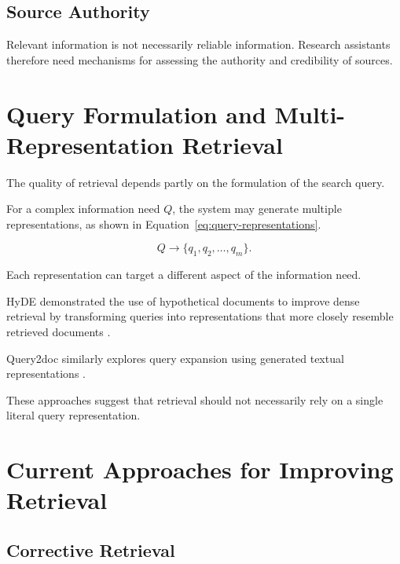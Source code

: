 \documentclass[12pt,a4paper]{article}
\begin{document}
\subsection{Source Authority}

Relevant information is not necessarily reliable information. Research
assistants therefore need mechanisms for assessing the authority and
credibility of sources.

\section{Query Formulation and Multi-Representation Retrieval}
\label{sec:query-formulation}

The quality of retrieval depends partly on the formulation of the search
query.

For a complex information need $Q$, the system may generate multiple
representations, as shown in Equation~\ref{eq:query-representations}.

\begin{equation}
Q \rightarrow \{q_1,q_2,\ldots,q_m\}.
\label{eq:query-representations}
\end{equation}

Each representation can target a different aspect of the information need.

HyDE demonstrated the use of hypothetical documents to improve dense
retrieval by transforming queries into representations that more closely
resemble retrieved documents \cite{gao2023hyde}.

Query2doc similarly explores query expansion using generated textual
representations \cite{wang2023query2doc}.

These approaches suggest that retrieval should not necessarily rely on a
single literal query representation.

\section{Current Approaches for Improving Retrieval}
\label{sec:current-approaches}

\subsection{Corrective Retrieval}
\end{document}
